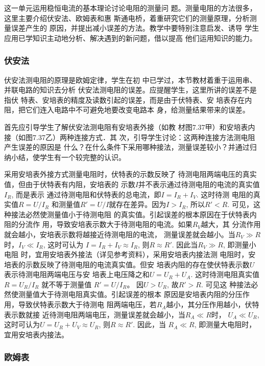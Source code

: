 这一单元运用稳恒电流的基本理论讨论电阻的测量问
题。测量电阻的方法很多，这里主要介绍伏安法、欧姆表和惠
斯通电桥，着重研究它们的测量原理，分析测量误差产生的
原因，并提出减小误差的方法。教学中要特别注意启发、诱导
学生应用已学知识主动地分析、解决遇到的新问题，借以提高
他们运用知识的能力。

\subsubsection{伏安法}

伏安法测电阻的原理是欧姆定律，学生在初
中已学过，本节教材着重于运用串、并联电路的知识去分析
伏安法测电阻的误差。应提醒学生，这里所讲的误差不是指伏
特表、安培表的精度及读数引起的误差，而是由于伏特表、安
培表存在内阻，把它们连入电路中不可避免地要改变电路本
身，给测量结果带来的误差。

首先应引导学生了解伏安法测电阻有安培表外接（如教
材图7.37甲）和安培表内接（如图7.37乙）两种连接方式．其
次，引导学生讨论：这两种连接方法测电阻产生误差的原因是
什么？在什么条件下采用哪种接法，测量误差较小？并通过归
纳小结，使学生有一个较完整的认识。

采用安培表外接方式测量电阻时，伏特表的示数反映了
待测电阻两端电压的真实值，但由于伏特表有内阻，安培表的
示数$I$并不表示通过待测电阻的电流的真实值$I_R$, 而是表示
通过待测电阻和伏特表的总电流，即$I=I_R+I_V$. 这时待测
电阻的真实值$R=U/I_R$
和测量值$R'=U/I$就存在差异。因为$I>
I_R$, 所以$R'<R$. 可见，这种接法必然使测量值小于待测电阻
的真实值。引起误差的根本原因在于伏特表内阻的分流作
用，导致安培表示数大于待测电阻的电流。如果$R_V$越大，其
分流作用就会越小，安培表示数将越接近待测电阻的电流，
测量误差就会越小。当$R_V\gg R$时，$I_V\ll I_R$, 这时可认为
$I=I_R+I_V\approx I_R$, 则$R\approx R'$. 因此当$R_V\gg R$, 即测量小电阻
时，宜用安培表外接法（详见参考资料），采用安培表内接法测
电阻时，安培表的示数反映了待测电阻的电流真实值。但安
培表内阻的存在使伏特表示数$U$表示待测电阻两端电压与安
培表上电压降之和$U=U_R+U_A$. 这时待测电阻真实值$R=U_R/I_R$
就不等于测量值 $R'=U/I_R$。
因$U>U_R$, 故$R'>R$. 可见这
种接法必然使测量值大于待测电阻真实值。引起误差的根本
原因是安培表内阻的分压作用，导致伏特表示数大于待测电
阻两端电压，若$R_A$越小，其分压作用越小，伏特表示数就接
近待测电阻两端电压，测量误差就会越小，当$R_A\ll R$时，
$U_A\ll U_R$, 这时可认为$U=U_R+U_V\approx U_R$, 则$R\approx R'$. 因此，当
$R_A\ll R$, 即测量大电阻时，宜用安培表内接法。

\subsubsection{欧姆表}

